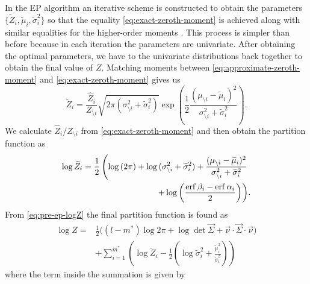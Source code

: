 \documentclass[11pt,twoside]{report}
\begin{document}
In the EP algorithm an iterative scheme is constructed to obtain the parameters $\{\widetilde{Z}_i, \widetilde{\mu}_i, \widetilde{\sigma}_i^2\}$ so that the equality \eqref{eq:exact-zeroth-moment} is achieved along with similar equalities for the higher-order moments \cite{Minka2001,MinkaUAI2001,Rasmussen2006,Cunningham2011}.
This process is simpler than before because in each iteration the parameters are univariate.
After obtaining the optimal parameters, we have to the univariate distributions back together to obtain the final value of $Z$.
Matching moments between \eqref{eq:approximate-zeroth-moment} and \eqref{eq:exact-zeroth-moment} gives us
\begin{equation}
  \widetilde{Z}_i = \frac{\widehat{Z}_i}{Z_{\setminus i}}
  \sqrt{2 \pi (\sigma_{\setminus i}^2 + \widetilde{\sigma}_i^2)}
  \exp{\left(
    \frac{1}{2}
    \frac{(\mu_{\setminus i} - \widetilde{\mu}_i)^2}{\sigma_{\setminus i}^2 + \widetilde{\sigma}_i^2}
    \right)}.
\end{equation}
We calculate $\widehat{Z}_i / Z_{\setminus i}$ from \eqref{eq:exact-zeroth-moment} and then obtain the partition function as
\begin{equation}\label{eq:well-behaved-logZhat}
  \begin{split}
    \log{\widetilde{Z}_i}
    =
    \frac{1}{2} \left(
    \log{(2\pi)} +
    \log{(\sigma_{\setminus i}^2 + \widetilde{\sigma}_i^2)} +
    \frac{(\mu_{\setminus i} - \widetilde{\mu}_i)^2}{\sigma_{\setminus i}^2 + \widetilde{\sigma}_i^2}
    \right.&
    \\
    \left.
    + \log{\left(\frac{\operatorname{erf}{\beta_i} - \operatorname{erf}{\alpha_i}}{2}\right)}
    \right)&.
  \end{split}
\end{equation}
From \eqref{eq:pre-ep-logZ} the final partition function is found as
\begin{equation}
  \begin{split}
    \log{Z}
    =&
    \frac{1}{2} \Big(
    (l-m^*) \log{2\pi}
    + \log\det{\vec{\Sigma}}
    + \vec{\nu} \cdot \vec{\Sigma} \cdot \vec{\nu}
    \Big)
    \\ &
    + \sum_{i=1}^{m^*} \left(
    \log{\widetilde{Z}_i}
    - \frac{1}{2}
    \left(
    \log{\widetilde{\sigma}_i^2}
    + \frac{\widetilde{\mu}_i^2}{\widetilde{\sigma}_i^2}
    \right)
    \right)
  \end{split}
\end{equation}
where the term inside the summation is given by \cite{Cunningham2011}
\end{document}

